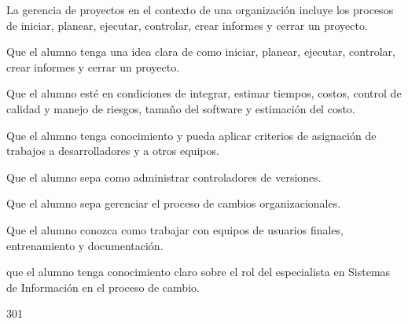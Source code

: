 \begin{syllabus}


\begin{justification}
La gerencia de proyectos en el contexto de una organización incluye los procesos de iniciar, planear, ejecutar, controlar, crear informes y cerrar un proyecto.
\end{justification}

\begin{goals}
\item Que el alumno tenga una idea clara de como iniciar, planear, ejecutar, controlar, crear informes y cerrar un proyecto.
\item Que el alumno esté en condiciones de integrar, estimar tiempos, costos, control de calidad y manejo de riesgos, tamaño del software y estimación del costo.
\item Que el alumno tenga conocimiento y pueda aplicar criterios de asignación de trabajos a desarrolladores y a otros equipos.
\item Que el alumno sepa como administrar controladores de versiones. 
\item Que el alumno sepa gerenciar el proceso de cambios organizacionales.
\item Que el alumno conozca como trabajar con equipos de usuarios finales, entrenamiento y documentación.
\item que el alumno tenga conocimiento claro sobre el rol del especialista en Sistemas de Información en el proceso de cambio.
\end{goals}

\begin{outcomes}
\end{outcomes}

\begin{unit}{\LUTWOOHEIGHTDef}{\LUTWOOHEIGHTBib}{30}{1}
   \begin{topics}
 	  	\item \TDSSEVENTopicTHREExSEVENxTWO
 	  	\item \TDSSEVENTopicTHREExSEVENxFOUR
 	  	\item \TDSSEVENTopicTHREExSEVENxSIX
 	  	\item \TDSSEVENTopicTHREExSEVENxSEVEN
 	  	\item \TDSSEVENTopicTHREExSEVENxONE
 	  	\item \TDSSEVENTopicTHREExSEVENxFIVE
 	  	\item \TDSSEVENTopicTHREExSEVENxTHREE
 	  	\item \TDSSEVENTopicTHREExSEVENxONETWO
 	  	\item \TDSSIXTopicTHREExSIXxTHREE
 	  	\item \TDSSEVENTopicTHREExSEVENxONETHREE
   \end{topics}
	\LUTWOOHEIGHTGoal
\end{unit}


\end{syllabus}
